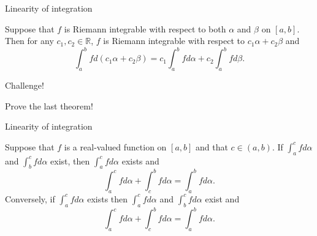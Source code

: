 \documentclass{beamer}
\begin{document}
\begin{frame}{Linearity of integration}
\begin{thm}
Suppose that $f$ is Riemann integrable with respect to both $\alpha$ and $\beta$ on $[a,b]$.\\
\pause
Then for any $c_1,c_2\in\mathbb{R}$, $f$ is Riemann integrable with respect to $c_1\alpha + c_2\beta$ and
$$\int_a^b f d(c_1\alpha + c_2\beta) = c_1\int_a^b f d\alpha + c_2\int_a^b f d\beta.$$
\end{thm}
\end{frame}

\begin{frame}{Challenge!}
\begin{prob}
Prove the last theorem!
\end{prob}
\end{frame}

\begin{frame}{Linearity of integration}
\begin{thm}
Suppose that $f$ is a real-valued function on $[a,b]$ and that $c\in (a,b)$.
\pause
If $\int_a^c fd\alpha$ and $\int_b^c fd\alpha$ exist, then $\int_a^cfd\alpha$ exists and
$$\int_a^c fd\alpha + \int_c^b fd\alpha = \int_a^b fd\alpha.$$
\pause
Conversely, if $\int_a^c fd\alpha$ exists then $\int_a^c fd\alpha$ and $\int_b^c fd\alpha$ exist and
$$\int_a^c fd\alpha + \int_c^b fd\alpha = \int_a^b fd\alpha.$$
\end{thm}
\end{frame}
\end{document}
